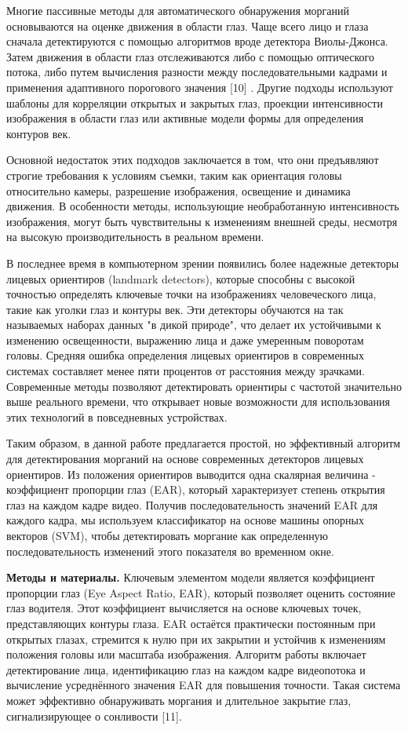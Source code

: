Многие пассивные методы для автоматического обнаружения морганий
основываются на оценке движения в области глаз. Чаще всего лицо и глаза
сначала детектируются с помощью алгоритмов вроде детектора Виолы-Джонса.
Затем движения в области глаз отслеживаются либо с помощью оптического
потока, либо путем вычисления разности между последовательными кадрами и
применения адаптивного порогового значения {[}10{]} . Другие подходы
используют шаблоны для корреляции открытых и закрытых глаз, проекции
интенсивности изображения в области глаз или активные модели формы для
определения контуров век.

Основной недостаток этих подходов заключается в том, что они предъявляют
строгие требования к условиям съемки, таким как ориентация головы
относительно камеры, разрешение изображения, освещение и динамика
движения. В особенности методы, использующие необработанную
интенсивность изображения, могут быть чувствительны к изменениям внешней
среды, несмотря на высокую производительность в реальном времени.

В последнее время в компьютерном зрении появились более надежные
детекторы лицевых ориентиров (landmark detectors), которые способны с
высокой точностью определять ключевые точки на изображениях
человеческого лица, такие как уголки глаз и контуры век. Эти детекторы
обучаются на так называемых наборах данных "в дикой природе", что делает
их устойчивыми к изменению освещенности, выражению лица и даже умеренным
поворотам головы. Средняя ошибка определения лицевых ориентиров в
современных системах составляет менее пяти процентов от расстояния между
зрачками. Современные методы позволяют детектировать ориентиры с
частотой значительно выше реального времени, что открывает новые
возможности для использования этих технологий в повседневных
устройствах.

Таким образом, в данной работе предлагается простой, но эффективный
алгоритм для детектирования морганий на основе современных детекторов
лицевых ориентиров. Из положения ориентиров выводится одна скалярная
величина - коэффициент пропорции глаз (EAR), который характеризует
степень открытия глаз на каждом кадре видео. Получив последовательность
значений EAR для каждого кадра, мы используем классификатор на основе
машины опорных векторов (SVM), чтобы детектировать моргание как
определенную последовательность изменений этого показателя во временном
окне.

{\bfseries Методы и материалы.} Ключевым элементом модели является
коэффициент пропорции глаз (Eye Aspect Ratio, EAR), который позволяет
оценить состояние глаз водителя. Этот коэффициент вычисляется на основе
ключевых точек, представляющих контуры глаза. EAR остаётся практически
постоянным при открытых глазах, стремится к нулю при их закрытии и
устойчив к изменениям положения головы или масштаба изображения.
Алгоритм работы включает детектирование лица, идентификацию глаз на
каждом кадре видеопотока и вычисление усреднённого значения EAR для
повышения точности. Такая система может эффективно обнаруживать моргания
и длительное закрытие глаз, сигнализирующее о сонливости {[}11{]}.

